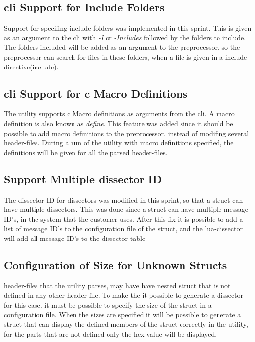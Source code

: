 \subsection{\gls{cli} Support for Include Folders}
Support for specifing include folders was implemented in this sprint. This is 
given as an argument to the \gls{cli} with  \emph{-I} or \emph{-Includes} followed 
by the folders to include. The folders included will be added as an argument 
to the \gls{preprocessor}, so the \gls{preprocessor} can search for files in these 
folders, when a file is given in a include directive(\gls{include}). 

\subsection{\gls{cli} Support for \Gls{c} Macro Definitions}
The \gls{utility} supports \Gls{c} Macro definitions as arguments from the \gls{cli}. A macro 
definition is also known as \emph{\gls{define}}. This feature was added since it 
should be possible to add macro definitions to the \gls{preprocessor}, instead of 
modifing several \gls{header}-files. During a run of the \gls{utility} with macro 
definitions specified, the definitions will be given for all the parsed 
\gls{header}-files.

\subsection{Support Multiple \gls{dissector} ID }
The \gls{dissector} ID for \glspl{dissector} was modified in this sprint, so that a \gls{struct} 
can have multiple \glspl{dissector}. This was done since a \gls{struct} can have multiple 
message ID's, in the system that the customer uses. After this fix it is 
possible to add a list of message ID's to the configuration file of the 
\gls{struct}, and the \Gls{lua}-\gls{dissector} will add all message ID's to the \gls{dissector} table.

\subsection{Configuration of Size for Unknown Structs}
\Gls{header}-files that the \gls{utility} parses, may have have nested \gls{struct} that is not 
defined in any other \gls{header} file. To make the it possible to generate a 
\gls{dissector} for this case, it must be possible to specify the size of the \gls{struct} 
in a configuration file. When the sizes are specified it will be possible to 
generate a \gls{struct} that can display the defined \glspl{member} of the \gls{struct} correctly 
in the \gls{utility}, for the parts that are not defined only the hex value will be 
displayed. 

